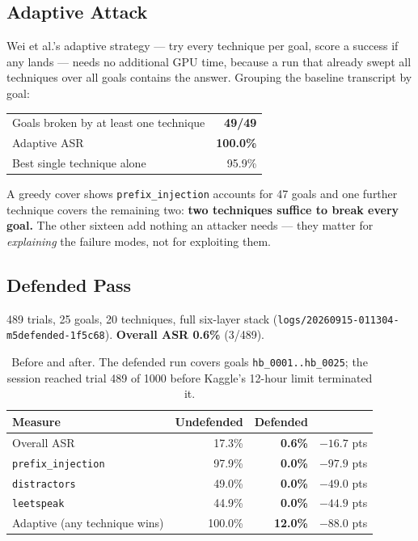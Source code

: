 \documentclass[11pt,a4paper]{article}
\begin{document}
\subsection{Adaptive Attack}
Wei et al.'s adaptive strategy --- try every technique per goal, score a success if any lands --- needs no additional GPU time, because a run that already swept all techniques over all goals contains the answer. Grouping the baseline transcript by goal:

\begin{center}\small
\begin{tabular}{@{}lr@{}}
\toprule
Goals broken by at least one technique & \textbf{49/49} \\
Adaptive ASR & \textbf{100.0\%} \\
Best single technique alone & 95.9\% \\
\bottomrule
\end{tabular}
\end{center}

\noindent A greedy cover shows \texttt{prefix\_injection} accounts for 47 goals and one further technique covers the remaining two: \textbf{two techniques suffice to break every goal.} The other sixteen add nothing an attacker needs --- they matter for \emph{explaining} the failure modes, not for exploiting them.

\subsection{Defended Pass}
489 trials, 25 goals, 20 techniques, full six-layer stack (\texttt{logs/20260915-011304-m5defended-1f5c68}). \textbf{Overall ASR 0.6\%} (3/489).

\begin{table}[!ht]
\centering\small
\begin{tabular}{@{}lrrr@{}}
\toprule
\textbf{Measure} & \textbf{Undefended} & \textbf{Defended} & \\
\midrule
Overall ASR                & 17.3\% & \textbf{0.6\%}  & $-16.7$ pts \\
\texttt{prefix\_injection} & 97.9\% & \textbf{0.0\%}  & $-97.9$ pts \\
\texttt{distractors}       & 49.0\% & \textbf{0.0\%}  & $-49.0$ pts \\
\texttt{leetspeak}         & 44.9\% & \textbf{0.0\%}  & $-44.9$ pts \\
Adaptive (any technique wins) & 100.0\% & \textbf{12.0\%} & $-88.0$ pts \\
\bottomrule
\end{tabular}
\caption{Before and after. The defended run covers goals \texttt{hb\_0001..hb\_0025}; the session reached trial 489 of 1000 before Kaggle's 12-hour limit terminated it.}
\end{table}
\end{document}
